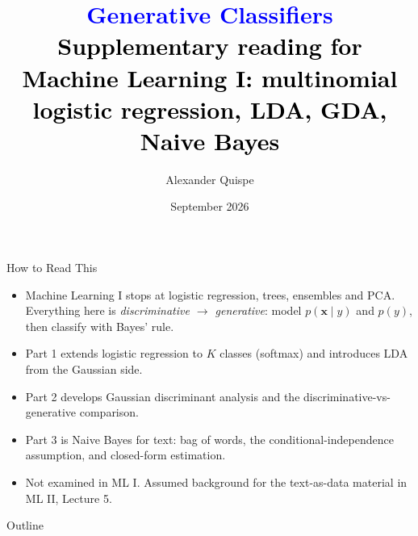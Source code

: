 \documentclass[11pt,aspectratio=169]{beamer}
\title{\textcolor{blue}{Generative Classifiers}\\ \textcolor{black}{\normalsize Supplementary reading for Machine Learning I: multinomial logistic regression, LDA, GDA, Naive Bayes}}
\author{Alexander Quispe}
\institute{ENEI -- INEI \,\textperiodcentered\, PEU-CD 2026}
\date{September 2026}
\begin{document}
\begin{frame}
\maketitle
\end{frame}

\begin{frame}{How to Read This}
\begin{itemize}
  \item Machine Learning I stops at logistic regression, trees, ensembles and PCA. Everything here is \emph{discriminative $\to$ generative}: model $p(\mathbf{x}\mid y)$ and $p(y)$, then classify with Bayes' rule.
  \item Part 1 extends logistic regression to $K$ classes (softmax) and introduces LDA from the Gaussian side.
  \item Part 2 develops Gaussian discriminant analysis and the discriminative-vs-generative comparison.
  \item Part 3 is Naive Bayes for text: bag of words, the conditional-independence assumption, and closed-form estimation.
  \item Not examined in ML I. Assumed background for the text-as-data material in ML II, Lecture 5.
\end{itemize}
\end{frame}

\begin{frame}{Outline}
\tableofcontents
\end{frame}




\end{document}
